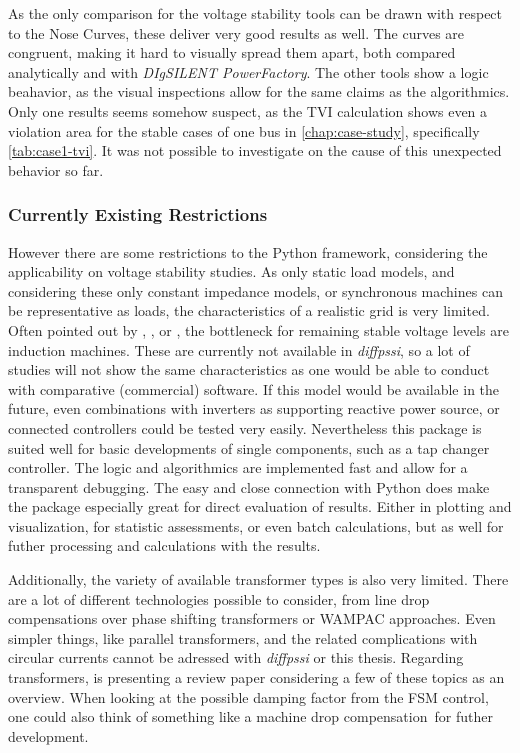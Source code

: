 As the only comparison for the voltage stability tools can be drawn with respect to the Nose Curves, these deliver very good results as well.
The curves are congruent, making it hard to visually spread them apart, both compared analytically and with \textit{DIgSILENT PowerFactory}.
The other tools show a logic beahavior, as the visual inspections allow for the same claims as the algorithmics.
Only one results seems somehow suspect, as the \acs{TVI} calculation shows even a violation area for the stable cases of one bus in \autoref{chap:case-study}, specifically \autoref{tab:case1-tvi}.
It was not possible to investigate on the cause of this unexpected behavior so far.

\subsubsection{Currently Existing Restrictions}

However there are some restrictions to the Python framework, considering the applicability on voltage stability studies.
As only static load models, and considering these only constant impedance models, or synchronous machines can be representative as loads, the characteristics of a realistic grid is very limited.
Often pointed out by \textcite{cutsem_1998}, \textcite{kundur_2022}, or \textcite{danish_2015}, the bottleneck for remaining stable voltage levels are induction machines.
These are currently not available in \textit{diffpssi}, so a lot of studies will not show the same characteristics as one would be able to conduct with comparative (commercial) software.
If this model would be available in the future, even combinations with inverters as supporting reactive power source, or connected controllers could be tested very easily.
Nevertheless this package is suited well for basic developments of single components, such as a tap changer controller.
The logic and algorithmics are implemented fast and allow for a transparent debugging.
The easy and close connection with Python does make the package especially great for direct evaluation of results.
Either in plotting and visualization, for statistic assessments, or even batch calculations, but as well for futher processing and calculations with the results. 

Additionally, the variety of available transformer types is also very limited.
There are a lot of different technologies possible to consider, from line drop compensations over phase shifting transformers or \ac{WAMPAC} approaches.
Even simpler things, like parallel transformers, and the related complications with circular currents cannot be adressed with \textit{diffpssi} or this thesis.
Regarding transformers, \textcite{sarimuthu_2016} is presenting a review paper considering a few of these topics as an overview.
When looking at the possible damping factor from the \acs{FSM} control, one could also think of something like a \glqq machine drop compensation\grqq~for futher development.


